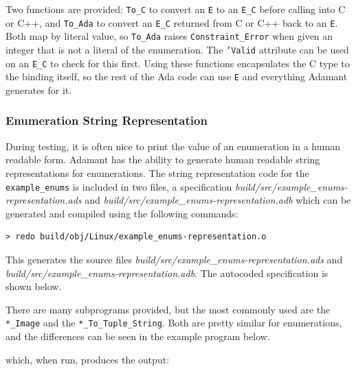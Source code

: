 Two functions are provided: \texttt{To\_C} to convert an \texttt{E} to an \texttt{E\_C} before calling into C or C++, and \texttt{To\_Ada} to convert an \texttt{E\_C} returned from C or C++ back to an \texttt{E}. Both map by literal value, so \texttt{To\_Ada} raises \texttt{Constraint\_Error} when given an integer that is not a literal of the enumeration. The \texttt{'Valid} attribute can be used on an \texttt{E\_C} to check for this first. Using these functions encapsulates the C type to the binding itself, so the rest of the Ada code can use \texttt{E} and everything Adamant generates for it.

\subsubsection{Enumeration String Representation}

During testing, it is often nice to print the value of an enumeration in a human readable form. Adamant has the ability to generate human readable string representations for enumerations. The string representation code for the \texttt{example\_enums} is included in two files, a specification \textit{build/src/example\_enums-representation.ads} and \textit{build/src/example\_enums-representation.adb} which can be generated and compiled using the following commands: 

\vspace{5mm} %
\begin{verbatim}
> redo build/obj/Linux/example_enums-representation.o
\end{verbatim}
\vspace{5mm} %

This generates the source files \textit{build/src/example\_enums-representation.ads} and \textit{build/src/example\_enums-representation.adb}. The autocoded specification is shown below.


There are many subprograms provided, but the most commonly used are the \texttt{*\_Image} and the \texttt{*\_To\_Tuple\_String}. Both are pretty similar for enumerations, and the differences can be seen in the example program below.


which, when run, produces the output:

\vspace{5mm} %
\inputminted{text}{../example_architecture/enum_representation/output.txt}
\vspace{5mm} %

